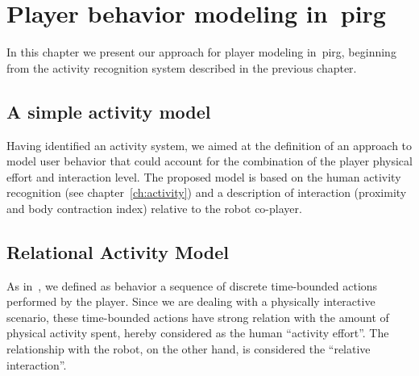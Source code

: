 \chapter{Player behavior modeling in~\glsdesc{pirg}}\label{ch:modeling}


In this chapter we present our approach for player modeling in~\gls{pirg}, beginning from the activity recognition system described in the previous chapter.

\section{A simple activity model}
Having identified an activity system, we aimed at the definition of an approach to model user behavior that could account for the combination of the player physical effort and interaction level. The proposed model is based on the human activity recognition (see chapter~\ref{ch:activity}) and a description of interaction (proximity and body contraction index) relative to the robot co-player. %

\section{Relational Activity Model}\label{theModel}

As in~\cite{etheredge_generic_2013}, we defined as behavior a sequence of discrete time-bounded actions performed by the player. Since we are dealing with a physically interactive scenario, these time-bounded actions have strong relation with the amount of physical activity spent, hereby considered as the human ``activity effort''. The relationship with the robot, on the other hand, is considered the ``relative interaction''. 

